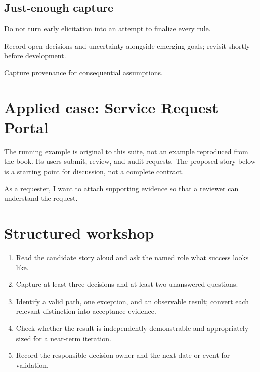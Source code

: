 \documentclass[11pt,letterpaper]{article}
\begin{document}
\subsection{Just-enough capture}
Do not turn early elicitation into an attempt to finalize every rule.

\begin{tcolorbox}[colback=tealback,colframe=navy,title={Engineering translation},breakable]
Record open decisions and uncertainty alongside emerging goals; revisit shortly before development.

\end{tcolorbox}
\begin{tcolorbox}[colback=amberback,colframe=navy,title={Failure mode to watch},breakable]
Capture provenance for consequential assumptions.

\end{tcolorbox}
\section{Applied case: Service Request Portal}
The running example is original to this suite, not an example reproduced from the book. Its users submit, review, and audit requests. The proposed story below is a starting point for discussion, not a complete contract.

\begin{tcolorbox}[colback=blueback,colframe=navy,title={Candidate story},breakable]
As a requester, I want to attach supporting evidence so that a reviewer can understand the request.

\end{tcolorbox}
\section{Structured workshop}
\begin{enumerate}[leftmargin=*,itemsep=3pt]
\item Read the candidate story aloud and ask the named role what success looks like.
\item Capture at least three decisions and at least two unanswered questions.
\item Identify a valid path, one exception, and an observable result; convert each relevant distinction into acceptance evidence.
\item Check whether the result is independently demonstrable and appropriately sized for a near-term iteration.
\item Record the responsible decision owner and the next date or event for validation.
\end{enumerate}
\end{document}
